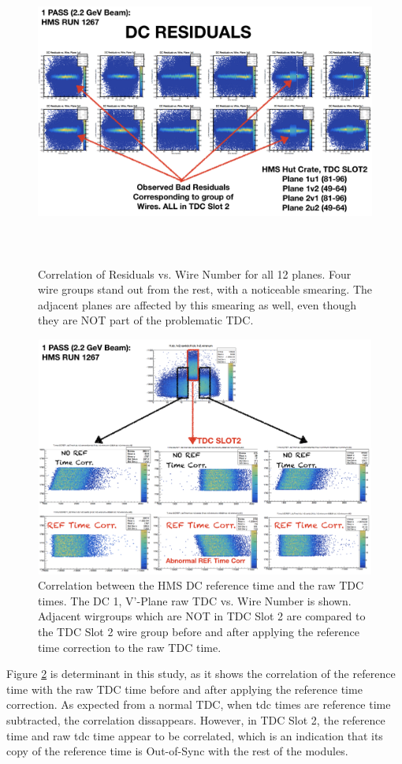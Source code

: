 \documentclass[11pt]{article}
\begin{document}
\begin{figure}[h!]
  \centering
  \includegraphics[width=7.0in, height=4.0in]{bad_wireresidual.png}
  \caption{Correlation of Residuals vs. Wire Number for all 12 planes. Four wire groups stand out from the rest, with a noticeable smearing.
  The adjacent planes are affected by this smearing as well, even though they are NOT part of the problematic TDC.}
  \label{fig:wire_residual}
\end{figure}
\begin{figure}[h!]
  \centering
  \includegraphics[width=5.1in, height=3.1in]{hDC_RefTime_correlation.png}
  \caption{Correlation between the HMS DC reference time and the raw TDC times. The DC 1, V'-Plane raw TDC vs. Wire Number is shown. Adjacent wirgroups which
  are NOT in TDC Slot 2 are compared to the TDC Slot 2 wire group before and after applying the reference time correction to the raw TDC time.}
  \label{fig:hDC_correlation}
\end{figure}
\newpage
Figure \ref{fig:hDC_correlation} is determinant in this study, as it shows the correlation of the reference time with the raw TDC time before and after applying the reference time correction.
As expected from a normal TDC, when tdc times are reference time subtracted, the correlation dissappears. However, in TDC Slot 2, the reference time and raw tdc time appear to be
correlated, which is an indication that its copy of the reference time is Out-of-Sync with the rest of the modules.
\end{document}
